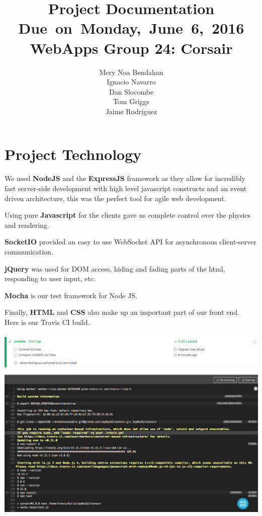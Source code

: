 \documentclass{article}
\title{
\vspace{2in}
\textmd{\textbf{Project Documentation}}\\
\normalsize\vspace{0.1in}\small{Due\ on\ Monday,\ June\ 6,\ 2016}\\
\vspace{0.1in}\large{\textbf{WebApps Group 24: Corsair}}
\vspace{3in}
}
\author{Mery Noa Bendahan \\ Ignacio Navarro \\ Dan Slocombe \\ Tom Griggs \\ Jaime Rodriguez}
\date{}
\renewcommand{\_}{\char`_}
\begin{document}
\section{Project Technology}

We used \textbf{NodeJS} and the \textbf{ExpressJS} framework as they allow for incredibly fast server-side development with 
high level javascript constructs and an event driven architecture, this was the perfect tool for agile web development.

Using pure \textbf{Javascript} for the clients gave us complete control over the 
physics and rendering.

\textbf{SocketIO} provided an easy to use WebSocket API for asynchronous
client-server communication.

\textbf{jQuery} was used for DOM access, hiding and fading parts of the html, 
responding to user input, etc.

\textbf{Mocha} is our test framework for Node JS.

Finally, \textbf{HTML} and \textbf{CSS} also make up an important part of our front end.\\

Here is our Travis CI build.\\\\
\includegraphics[width=17.5cm]{tech.png}
\end{document}
